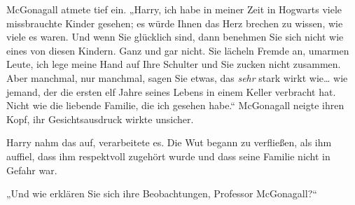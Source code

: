 McGonagall atmete tief ein. „Harry, ich habe in meiner Zeit in Hogwarts viele missbrauchte Kinder gesehen; es würde Ihnen das Herz brechen zu wissen, wie viele es waren. Und wenn Sie glücklich sind, dann benehmen Sie sich nicht wie eines von diesen Kindern. Ganz und gar nicht. Sie lächeln Fremde an, umarmen Leute, ich lege meine Hand auf Ihre Schulter und Sie zucken nicht zusammen. Aber manchmal, nur manchmal, sagen Sie etwas, das \emph{sehr} stark wirkt wie… wie jemand, der die ersten elf Jahre seines Lebens in einem Keller verbracht hat. Nicht wie die liebende Familie, die ich gesehen habe.“ McGonagall neigte ihren Kopf, ihr Gesichtsausdruck wirkte unsicher.

Harry nahm das auf, verarbeitete es. Die Wut begann zu verfließen, als ihm auffiel, dass ihm respektvoll zugehört wurde und dass seine Familie nicht in Gefahr war.

„Und wie erklären Sie sich ihre Beobachtungen, Professor McGonagall?“


